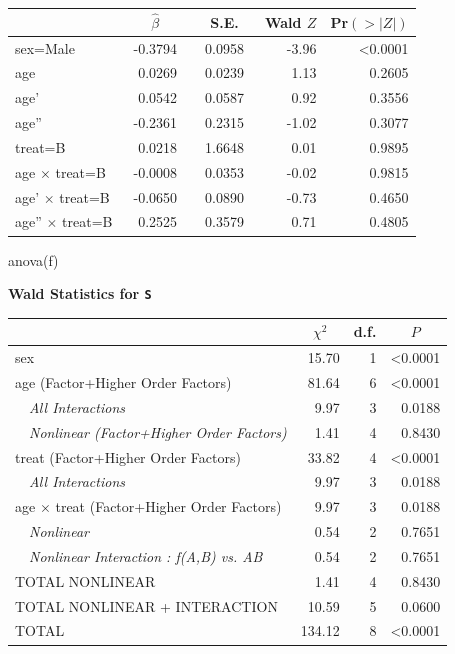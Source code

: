  \setlongtables\begin{longtable}{lrrrr}\hline
 \multicolumn{1}{l}{}&\multicolumn{1}{c}{$\hat{\beta}$}&\multicolumn{1}{c}{S.E.}&\multicolumn{1}{c}{Wald $Z$}&\multicolumn{1}{c}{Pr$(>|Z|)$}\tabularnewline
 \hline
 \endhead
 \hline
 \endfoot
 sex=Male&~-0.3794~&~0.0958~&-3.96&\textless 0.0001\tabularnewline
 age&~ 0.0269~&~0.0239~& 1.13&0.2605\tabularnewline
 age'&~ 0.0542~&~0.0587~& 0.92&0.3556\tabularnewline
 age''&~-0.2361~&~0.2315~&-1.02&0.3077\tabularnewline
 treat=B&~ 0.0218~&~1.6648~& 0.01&0.9895\tabularnewline
 age $\times$ treat=B&~-0.0008~&~0.0353~&-0.02&0.9815\tabularnewline
 age' $\times$ treat=B&~-0.0650~&~0.0890~&-0.73&0.4650\tabularnewline
 age'' $\times$ treat=B&~ 0.2525~&~0.3579~& 0.71&0.4805\tabularnewline
 \hline
 \end{longtable}
 \addtocounter{table}{-1}
\begin{Sinput}
anova(f)
\end{Sinput}
\textbf{\Needspace{2in}
Wald Statistics for \texttt{\smaller S}}\begin{center}
\begin{tabular}{lrrr}
\hline\hline
\multicolumn{1}{l}{}&\multicolumn{1}{c}{$\chi^{2}$}&\multicolumn{1}{c}{d.f.}&\multicolumn{1}{c}{$P$}\tabularnewline
\hline
sex& 15.70&1&\textless 0.0001\tabularnewline
age  (Factor+Higher Order Factors)& 81.64&6&\textless 0.0001\tabularnewline
~~\emph{All Interactions}&  9.97&3&0.0188\tabularnewline
~~\emph{Nonlinear (Factor+Higher Order Factors)}&  1.41&4&0.8430\tabularnewline
treat  (Factor+Higher Order Factors)& 33.82&4&\textless 0.0001\tabularnewline
~~\emph{All Interactions}&  9.97&3&0.0188\tabularnewline
age $\times$ treat  (Factor+Higher Order Factors)&  9.97&3&0.0188\tabularnewline
~~\emph{Nonlinear}&  0.54&2&0.7651\tabularnewline
~~\emph{Nonlinear Interaction : f(A,B) vs. AB}&  0.54&2&0.7651\tabularnewline
TOTAL NONLINEAR&  1.41&4&0.8430\tabularnewline
TOTAL NONLINEAR + INTERACTION& 10.59&5&0.0600\tabularnewline
TOTAL&134.12&8&\textless 0.0001\tabularnewline
\hline
\end{tabular}\end{center}

